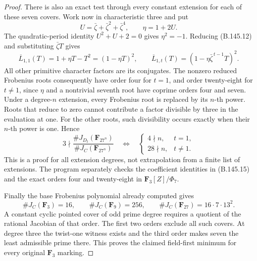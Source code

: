 \begin{proof}
There is also an exact test through every constant extension
for each of these seven covers.
Work now in characteristic three and put
\[
 U=\bar\zeta+\bar\zeta^2+\bar\zeta^4,\qquad
                    \eta=1+2U .
\]
The quadratic-period identity $U^2+U+2=0$ gives
$\eta^2=-1$.
Reducing (B.145.12) and substituting $\bar\zeta T$ gives
\[
 \overline L_{1,1}(T)=1+\eta T-T^2=(1-\eta T)^2,
 \qquad
 \overline L_{1,t}(T)
                  =(1-\eta\bar\zeta^{\,t-1}T)^2 .
                                                            \tag{B.145.15}
\]
All other primitive character factors are its conjugates.
The nonzero reduced Frobenius roots consequently have
order four for $t=1$, and order twenty-eight for $t\ne1$,
since $\eta$ and a nontrivial seventh root have coprime
orders four and seven.
Under a degree-$n$ extension, every Frobenius root is
replaced by its $n$-th power.
Roots that reduce to zero cannot contribute a factor
divisible by three in the evaluation at one.
For the other roots, such divisibility occurs exactly
when their $n$-th power is one.
Hence
\[
 3\nmid\frac{\#J_{D_t}(\mathbf F_{27^n})}
                 {\#J_C(\mathbf F_{27^n})}
 \quad\Longleftrightarrow\quad
 \begin{cases}
  4\nmid n,&t=1,\\
  28\nmid n,&t\ne1 .
 \end{cases}                                                \tag{B.145.16}
\]
This is a proof for all extension degrees, not extrapolation
from a finite list of extensions.
The program separately checks the coefficient identities
in (B.145.15) and the exact orders four and twenty-eight
in $\mathbf F_3[Z]/\Phi_7$.

Finally the base Frobenius polynomial already computed gives
\[
 \#J_C(\mathbf F_3)=16,\qquad
 \#J_C(\mathbf F_9)=256,\qquad
 \#J_C(\mathbf F_{27})=16\cdot7\cdot13^2 .
                                                            \tag{B.145.17}
\]
A constant cyclic pointed cover of odd prime degree requires
a quotient of the rational Jacobian of that order.
The first two orders exclude all such covers.
At degree three the twist-one witness exists and the third
order makes seven the least admissible prime there.
This proves the claimed field-first minimum for every
original $\mathbf F_3$ marking.
\end{proof}

